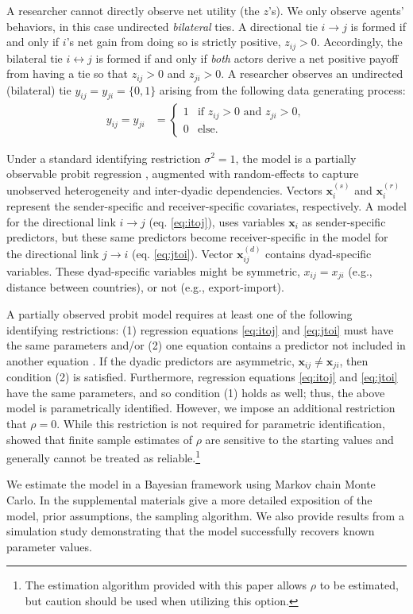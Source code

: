 A researcher cannot directly observe net utility (the $z$'s).  We only observe agents' behaviors, in this case undirected \emph{bilateral} ties. A directional tie $i \to j$ is formed if and only if $i$'s net gain from doing so is strictly positive, $z_{ij} > 0$.  Accordingly, the bilateral tie $i \leftrightarrow j$ is formed if and only if \emph{both} actors derive a net positive payoff from having a tie so that $z_{ij} > 0$ and $z_{ji} > 0$. A researcher observes an undirected (bilateral) tie $y_{ij} = y_{ji} = \{0, 1\}$ arising from the following data generating process:
\begin{align}
y_{ij} = y_{ji} & =   \left\{ \begin{array}{ll}
         1 & \mbox{if $z_{ij} > 0$ and $z_{ji} > 0$},\\
         0 & \mbox{else}.\end{array} \right. \label{mod:y}
\end{align}

Under a standard identifying restriction $\sigma^2 = 1$, the model is a partially observable probit regression \citep{poirier:1980}, augmented with random-effects to capture unobserved heterogeneity and inter-dyadic dependencies. Vectors $\bm{x}_i^{(s)}$ and $\bm{x}_i^{(r)}$ represent the sender-specific and receiver-specific covariates, respectively. A model for the directional link $i \to j$ (eq. \ref{eq:itoj}), uses variables $\bm{x}_i$ as sender-specific predictors, but these same predictors become receiver-specific in the model for the directional link $j \to i$ (eq. \ref{eq:jtoi}). Vector $\bm{x}_{ij}^{(d)}$ contains dyad-specific variables. These dyad-specific variables might be symmetric, $x_{ij} = x_{ji}$ (e.g., distance between countries), or not (e.g., export-import).

A partially observed probit model requires at least one of the following identifying restrictions: (1) regression equations \ref{eq:itoj} and \ref{eq:jtoi} must have the same parameters and/or (2) one equation contains a predictor not included in another equation \citep{poirier:1980}. If the dyadic predictors are asymmetric, $\bm{x}_{ij} \neq \bm{x}_{ji}$, then condition (2) is satisfied. Furthermore, regression equations \ref{eq:itoj} and \ref{eq:jtoi} have the same parameters, and so condition (1) holds as well; thus, the above model is parametrically identified. However, we impose an additional restriction that $\rho = 0$. While this restriction is not required for parametric identification, \citet{rajbhandari:2014} showed that finite sample estimates of $\rho$ are sensitive to the starting values and generally cannot be treated as reliable.\footnote{The estimation algorithm provided with this paper allows $\rho$ to be estimated, but caution should be used when utilizing this option.}
 
We estimate the model in a Bayesian framework using Markov chain Monte Carlo.  In the supplemental materials give a more detailed exposition of the model, prior assumptions, the sampling algorithm. We also provide results from a simulation study demonstrating that the model successfully recovers known parameter values.